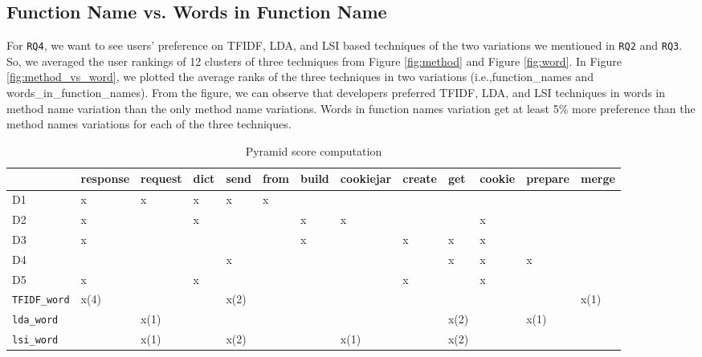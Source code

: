 \subsection{Function Name vs. Words in Function Name}
For \texttt{RQ4}, we want to see users' preference on TFIDF, LDA, and LSI based techniques of the two variations we mentioned in \texttt{RQ2} and \texttt{RQ3}.
So, we averaged the user rankings of 12 clusters of three techniques from Figure \ref{fig:method} and Figure \ref{fig:word}. In Figure \ref{fig:method_vs_word}, we plotted the average ranks of the three techniques in two variations (i.e.,function\_names and  words\_in\_function\_names). From the figure, we can observe that developers preferred TFIDF, LDA, and LSI techniques in words in method name variation than the only method name variations. Words in function names variation get at least 5\% more preference than the method names variations for each of the three techniques.
\begin{table}
\caption{Pyramid score computation }
\label{table-pyramid1}
\centering
\begin{tabular}{|l|l|l|l|l|l|l|l|l|l|l|l|l|}
\hline
  & response & request &	dict &	send &	from &	build &	cookiejar &	create &	get &	cookie &	prepare &	merge  \\ \hline
D1 & x      & x     & x           & x   & x    &        &         &     &      &    &  &    \\ \hline
D2 &     x   &      &  x       &     &    & x      & x       &   &      & x& &       \\ \hline
D3 & x      &       &           &    &     &    x    &         & x   &  x    & x & &     \\ \hline
D4 &        &       &             &   x  &     &        &        &     & x    & x    & x &    \\ \hline
D5 &  x     &      &    x         &     &     &        &        & x    &     & x    &  &   \\ \hline
\texttt{TFIDF\_word}  &   x(4)     &       &             &  x(2)   &  &        &     &     &  &  & & x(1)    \\ \hline
\texttt{lda\_word}  &        &   x(1)    &             &     &  &        &     &     & x(2) &   & x(1) &  \\ \hline
\texttt{lsi\_word}  &        &   x(1)    &             &  x(2)   &   &        &  x(1)     &     & x(2) &  & & \\ \hline
\end{tabular}
\end{table}

